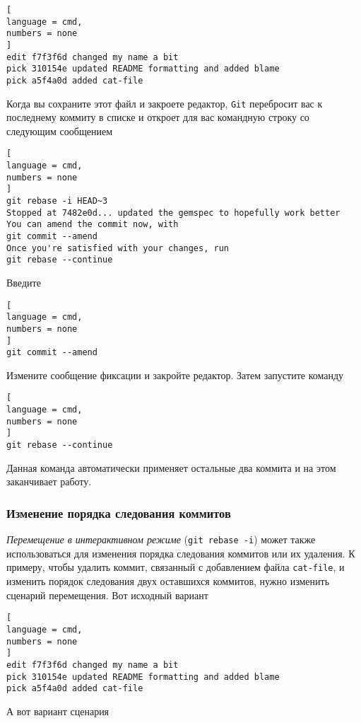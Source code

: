 \documentclass[%
	11pt,
	a4paper,
	utf8,
		]{article}
\begin{document}
\begin{lstlisting}[
language = cmd,
numbers = none
]
edit f7f3f6d changed my name a bit
pick 310154e updated README formatting and added blame
pick a5f4a0d added cat-file
\end{lstlisting}

Когда вы сохраните этот файл и закроете редактор, \texttt{Git} перебросит вас к последнему коммиту в списке и откроет для вас командную строку со следующим сообщением

\begin{lstlisting}[
language = cmd,
numbers = none
]
git rebase -i HEAD~3
Stopped at 7482e0d... updated the gemspec to hopefully work better
You can amend the commit now, with 
git commit --amend
Once you're satisfied with your changes, run
git rebase --continue
\end{lstlisting}

Введите 
\begin{lstlisting}[
language = cmd,
numbers = none
]
git commit --amend
\end{lstlisting}

Измените сообщение фиксации и закройте редактор. Затем запустите команду

\begin{lstlisting}[
language = cmd,
numbers = none
]
git rebase --continue
\end{lstlisting}

Данная команда автоматически применяет остальные два коммита и на этом заканчивает работу.

\subsubsection{Изменение порядка следования коммитов}

\emph{Перемещение в интерактивном режиме} (\lstinline{git rebase -i}) может также использоваться для изменения порядка следования коммитов или их удаления. К примеру, чтобы удалить коммит, связанный с добавлением файла \texttt{cat-file}, и изменить порядок следования двух оставшихся коммитов, нужно изменить сценарий перемещения. Вот исходный вариант

\begin{lstlisting}[
language = cmd,
numbers = none
]
edit f7f3f6d changed my name a bit
pick 310154e updated README formatting and added blame
pick a5f4a0d added cat-file 
\end{lstlisting}

А вот вариант сценария
\end{document}
